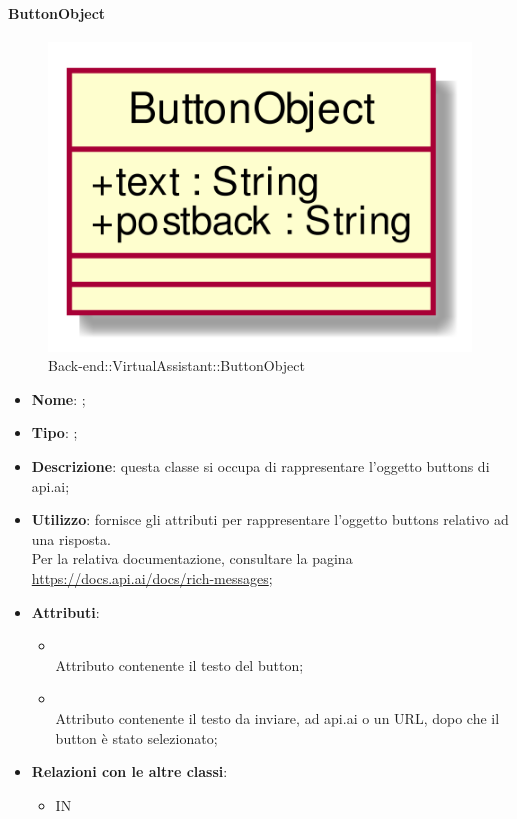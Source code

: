 \hypertarget{ButtonObject_label}{\paragraph{ButtonObject}}
\begin{figure}[h]
	\centering
	\includegraphics[width=\textwidth,height=\textheight,keepaspectratio]{images/ClassButtonObject.png}
	\caption{Back-end::VirtualAssistant::ButtonObject}
\end{figure}
\begin{itemize}
	\item \textbf{Nome}: ;
	\item \textbf{Tipo}: ;
	\item \textbf{Descrizione}: questa classe si occupa di rappresentare l'oggetto buttons di api.ai;
	\item \textbf{Utilizzo}: fornisce gli attributi per rappresentare l'oggetto buttons relativo ad una risposta. \\
Per la relativa documentazione, consultare la pagina \url{https://docs.api.ai/docs/rich-messages};
	\item \textbf{Attributi}:
	\begin{itemize}
		\item[]  \\
		Attributo contenente il testo del button;
		\item[]  \\
		Attributo contenente il testo da inviare, ad api.ai o un URL, dopo che il button è stato selezionato;
	\end{itemize}
	\item \textbf{Relazioni con le altre classi}:
	\begin{itemize}
		\item IN \hyperlink{MsgObject_label}{}
	\end{itemize}
\end{itemize}
\FloatBarrier

